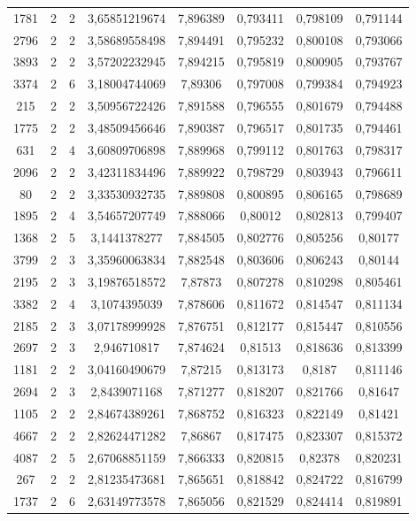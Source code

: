 \begin{longtable}{|c|c|c|c|c|c|c|c|}
1781 & 2 & 2 & 3,65851219674 & 7,896389 & 0,793411 & 0,798109 & 0,791144 \\
2796 & 2 & 2 & 3,58689558498 & 7,894491 & 0,795232 & 0,800108 & 0,793066 \\
3893 & 2 & 2 & 3,57202232945 & 7,894215 & 0,795819 & 0,800905 & 0,793767 \\
3374 & 2 & 6 & 3,18004744069 & 7,89306 & 0,797008 & 0,799384 & 0,794923 \\
215 & 2 & 2 & 3,50956722426 & 7,891588 & 0,796555 & 0,801679 & 0,794488 \\
1775 & 2 & 2 & 3,48509456646 & 7,890387 & 0,796517 & 0,801735 & 0,794461 \\
631 & 2 & 4 & 3,60809706898 & 7,889968 & 0,799112 & 0,801763 & 0,798317 \\
2096 & 2 & 2 & 3,42311834496 & 7,889922 & 0,798729 & 0,803943 & 0,796611 \\
80 & 2 & 2 & 3,33530932735 & 7,889808 & 0,800895 & 0,806165 & 0,798689 \\
1895 & 2 & 4 & 3,54657207749 & 7,888066 & 0,80012 & 0,802813 & 0,799407 \\
1368 & 2 & 5 & 3,1441378277 & 7,884505 & 0,802776 & 0,805256 & 0,80177 \\
3799 & 2 & 3 & 3,35960063834 & 7,882548 & 0,803606 & 0,806243 & 0,80144 \\
2195 & 2 & 3 & 3,19876518572 & 7,87873 & 0,807278 & 0,810298 & 0,805461 \\
3382 & 2 & 4 & 3,1074395039 & 7,878606 & 0,811672 & 0,814547 & 0,811134 \\
2185 & 2 & 3 & 3,07178999928 & 7,876751 & 0,812177 & 0,815447 & 0,810556 \\
2697 & 2 & 3 & 2,946710817 & 7,874624 & 0,81513 & 0,818636 & 0,813399 \\
1181 & 2 & 2 & 3,04160490679 & 7,87215 & 0,813173 & 0,8187 & 0,811146 \\
2694 & 2 & 3 & 2,8439071168 & 7,871277 & 0,818207 & 0,821766 & 0,81647 \\
1105 & 2 & 2 & 2,84674389261 & 7,868752 & 0,816323 & 0,822149 & 0,81421 \\
4667 & 2 & 2 & 2,82624471282 & 7,86867 & 0,817475 & 0,823307 & 0,815372 \\
4087 & 2 & 5 & 2,67068851159 & 7,866333 & 0,820815 & 0,82378 & 0,820231 \\
267 & 2 & 2 & 2,81235473681 & 7,865651 & 0,818842 & 0,824722 & 0,816799 \\
1737 & 2 & 6 & 2,63149773578 & 7,865056 & 0,821529 & 0,824414 & 0,819891 \\

\end{longtable}
